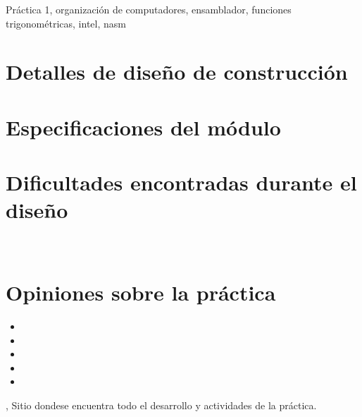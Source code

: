 \documentclass[%
	final,
	notitlepage,
	narroweqnarray,
	inline,
	twoside,
	]{ieee}
\begin{document}
\begin{keywords}
Práctica 1, organización de computadores, ensamblador, funciones trigonométricas, intel, nasm
\end{keywords}

\section{Detalles de diseño de construcción}

\PARstart 

\section{Especificaciones del módulo }

\begin{description}
\item
\item
\item
\item
\end{description}



\section{Dificultades encontradas durante el diseño}


\\ 
\section{Opiniones sobre la práctica}


\begin{itemize}
\item 
\item 
\item 
\item 
\item 
\end{itemize}



\begin{thebibliography}{1}

,
\newblock Sitio dondese encuentra todo el desarrollo y actividades de la práctica.

\end{thebibliography}

\end{document}
